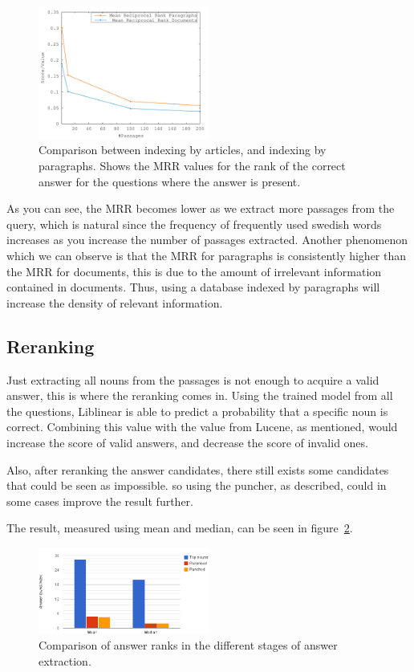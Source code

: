 \begin{figure}[h!]
  \centering
  \includegraphics[width=0.5\textwidth]{figures/median.pdf}
  \caption{Comparison between indexing by articles, and indexing by paragraphs. 
  Shows the MRR values for the rank of the correct answer for the questions where 
  the answer is present.}
  \label{fig:median}
\end{figure}

As you can see, the MRR becomes lower as we extract more passages from the query, which
is natural since the frequency of frequently used swedish words increases as you increase the number
of passages extracted. Another phenomenon which we can observe is that the MRR for 
paragraphs is consistently higher than the MRR for documents, this is due to the amount of irrelevant
information contained in documents. Thus, using a database indexed by paragraphs will increase 
the density of relevant information.

\subsection{Reranking}
Just extracting all nouns from the passages is not enough to acquire a valid answer, this is where the reranking comes in.
Using the trained model from all the questions, Liblinear is able to predict a probability that a specific noun is correct.
Combining this value with the value from Lucene, as mentioned, would increase the score of valid answers, and decrease the score of invalid ones.

Also, after reranking the answer candidates, there still exists some candidates that could be seen as impossible.
so using the puncher, as described, could in some cases improve the result further.

The result, measured using mean and median, can be seen in figure~\ref{fig:meanmedian}.

\begin{figure}[h!]
  \centering
  \hspace*{-0.6cm}
  \includegraphics[width=0.5\textwidth]{figures/meanMedian.png}
  \caption{Comparison of answer ranks in the different stages of answer extraction.}
  \label{fig:meanmedian}
\end{figure}

